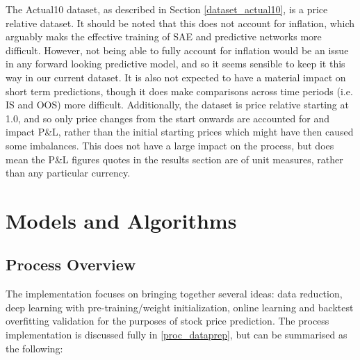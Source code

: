 \documentclass[a4paper,11pt,oneside]{article}
\theoremstyle{plain}
\theoremstyle{definition}
\begin{document}
The Actual10 dataset, as described in Section \ref{dataset_actual10}, is a price relative dataset. It should be noted that this does not account for inflation, which arguably maks the effective training of SAE and predictive networks more difficult. However, not being able to fully account for inflation would be an issue in any forward looking predictive model, and so it seems sensible to keep it this way in our current dataset. It is also not expected to have a material impact on short term predictions, though it does make comparisons across time periods (i.e. IS and OOS) more difficult. Additionally, the dataset is price relative starting at 1.0, and so only price changes from the start onwards are accounted for and impact P\&L, rather than the initial starting prices which might have then caused some imbalances. This does not have a large impact on the process, but does mean the P\&L figures quotes in the results section are of unit measures, rather than any particular currency.

\newpage
\section{Models and Algorithms}\label{Implementation}
\subsection{Process Overview}\label{ProcessOverview}\label{imp_overview}


The implementation focuses on bringing together several ideas: data reduction, deep learning with pre-training/weight initialization, online learning and backtest overfitting validation for the purposes of stock price prediction. The process implementation is discussed fully in \ref{proc_dataprep}, but can be summarised as the following:
\end{document}
